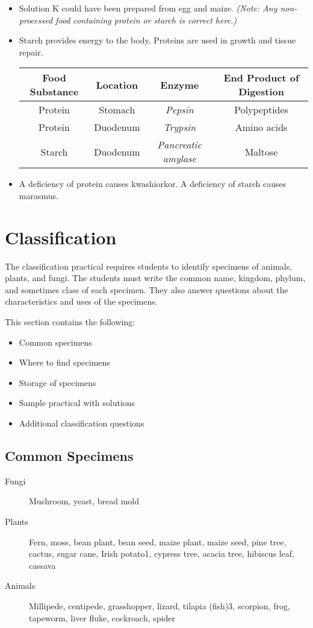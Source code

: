 \begin{itemize}
\item{Solution K could have been prepared from egg and maize. \textit{(Note: Any non-processed food containing protein or starch is correct here.)}}
\item{Starch provides energy to the body. Proteins are used in growth and tissue repair.}

\begin{center}
\begin{tabular}{ | c | c | c | c |}
\hline
Food Substance & Location & Enzyme & End Product of Digestion\\ \hline
Protein & Stomach & \textit{Pepsin} & Polypeptides \\ \hline
Protein & Duodenum & \textit{Trypsin} & Amino acids \\ \hline
Starch & Duodenum & \textit{Pancreatic amylase} & Maltose \\ \hline
\hline
\end{tabular}
\end{center}

\item{A deficiency of protein causes kwashiorkor. A deficiency of starch causes marasmus.}
\end{itemize}

\section{Classification}

The classification practical requires students to identify specimens of animals, plants, and fungi. The students must write the common name, kingdom, phylum, and sometimes class of each specimen. They also answer questions about the characteristics and uses of the specimens.

This section contains the following:
\begin{itemize}
\item{Common specimens}
\item{Where to find specimens}
\item{Storage of specimens}
\item{Sample practical with solutions}
\item{Additional classification questions}
\end{itemize}

\subsection{Common Specimens}
\begin{description}
\item[Fungi]{Mushroom, yeast, bread mold}
\item[Plants]{Fern, moss, bean plant, bean seed, maize plant, maize seed, pine tree, cactus, sugar cane, Irish potato1, cypress tree, acacia tree, hibiscus leaf, cassava}
\item[Animals]{Millipede, centipede, grasshopper, lizard, tilapia (fish)3, scorpion, frog, tapeworm, liver fluke, cockroach, spider}
\end{description}

